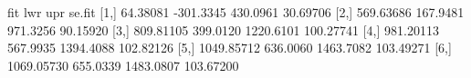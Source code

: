 \begin{Schunk}
\begin{Soutput}
            fit       lwr       upr    se.fit
[1,]   64.38081 -301.3345  430.0961  30.69706
[2,]  569.63686  167.9481  971.3256  90.15920
[3,]  809.81105  399.0120 1220.6101 100.27741
[4,]  981.20113  567.9935 1394.4088 102.82126
[5,] 1049.85712  636.0060 1463.7082 103.49271
[6,] 1069.05730  655.0339 1483.0807 103.67200
\end{Soutput}
\end{Schunk}
